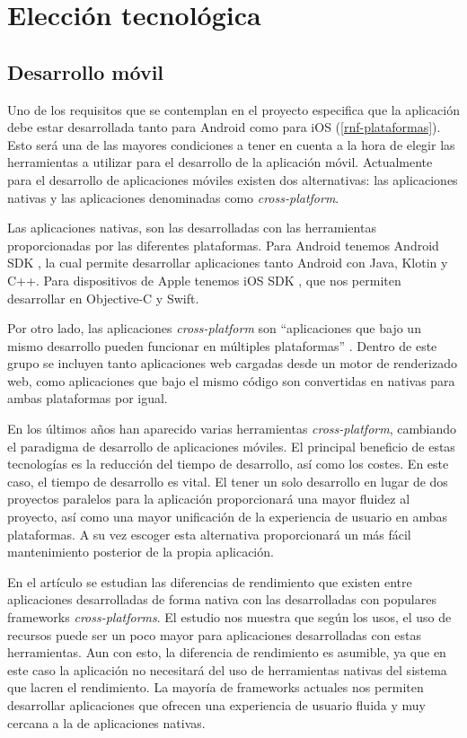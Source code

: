 \section{Elección tecnológica}

\subsection{Desarrollo móvil}

Uno de los requisitos que se contemplan en el proyecto especifica que la aplicación debe estar desarrollada tanto para Android como para iOS (\ref{rnf-plataformas}). Esto será una de las mayores condiciones a tener en cuenta a la hora de elegir las herramientas a utilizar para el desarrollo de la aplicación móvil. Actualmente para el desarrollo de aplicaciones móviles existen dos alternativas: las aplicaciones nativas y las aplicaciones denominadas como \textit{cross-platform}.

Las aplicaciones nativas, son las desarrolladas con las herramientas proporcionadas por las diferentes plataformas. Para Android tenemos Android SDK \cite{android-sdk}, la cual permite desarrollar aplicaciones tanto Android con Java, Klotin y C++. Para dispositivos de Apple tenemos iOS SDK \cite{ios-sdk}, que nos permiten desarrollar en Objective-C y Swift. 

Por otro lado, las aplicaciones \textit{cross-platform} son ``aplicaciones que bajo un mismo desarrollo pueden funcionar en múltiples plataformas'' \cite{cross-platform-comparacion}. Dentro de este grupo se incluyen tanto aplicaciones web cargadas desde un motor de renderizado web, como aplicaciones que bajo el mismo código son convertidas en nativas para ambas plataformas por igual. 

En los últimos años han aparecido varias herramientas \textit{cross-platform}, cambiando el paradigma de desarrollo de aplicaciones móviles. El principal beneficio de estas tecnologías es la reducción del tiempo de desarrollo, así como los costes. En este caso, el tiempo de desarrollo es vital. El tener un solo desarrollo en lugar de dos proyectos paralelos para la aplicación proporcionará una mayor fluidez al proyecto, así como una mayor unificación de la experiencia de usuario en ambas plataformas. A su vez escoger esta alternativa proporcionará un más fácil mantenimiento posterior de la propia aplicación. 

En el artículo \cite{cross-platform-comparacion} se estudian las diferencias de rendimiento que existen entre aplicaciones desarrolladas de forma nativa con las desarrolladas con populares frameworks \textit{cross-platforms}. El estudio nos muestra que según los usos, el uso de recursos puede ser un poco mayor para aplicaciones desarrolladas con estas herramientas. Aun con esto, la diferencia de rendimiento es asumible, ya que en este caso la aplicación no necesitará del uso de herramientas nativas del sistema que lacren el rendimiento. La mayoría de frameworks actuales nos permiten desarrollar aplicaciones que ofrecen una experiencia de usuario fluida y muy cercana a la de aplicaciones nativas.

